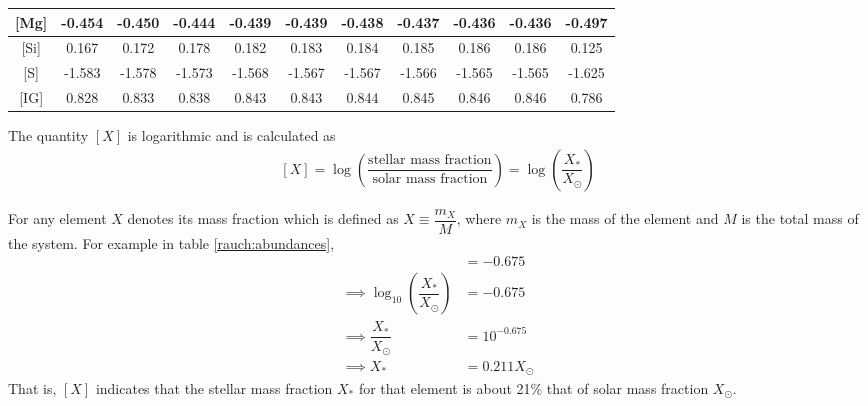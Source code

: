 \begin{table}[h!]
\begin{tabular}{|c|cccccccccc|}
						{[}Mg{]} & \multicolumn{1}{c|}{-0.454} & \multicolumn{1}{c|}{-0.450} & \multicolumn{1}{c|}{-0.444} & \multicolumn{1}{c|}{-0.439} & \multicolumn{1}{c|}{-0.439} & \multicolumn{1}{c|}{-0.438} & \multicolumn{1}{c|}{-0.437} & \multicolumn{1}{c|}{-0.436} & \multicolumn{1}{c|}{-0.436} & -0.497 \\ \hline
						{[}Si{]} & \multicolumn{1}{c|}{0.167} & \multicolumn{1}{c|}{0.172} & \multicolumn{1}{c|}{0.178} & \multicolumn{1}{c|}{0.182} & \multicolumn{1}{c|}{0.183} & \multicolumn{1}{c|}{0.184} & \multicolumn{1}{c|}{0.185} & \multicolumn{1}{c|}{0.186} & \multicolumn{1}{c|}{0.186} & 0.125 \\ \hline
						{[}S{]} & \multicolumn{1}{c|}{-1.583} & \multicolumn{1}{c|}{-1.578} & \multicolumn{1}{c|}{-1.573} & \multicolumn{1}{c|}{-1.568} & \multicolumn{1}{c|}{-1.567} & \multicolumn{1}{c|}{-1.567} & \multicolumn{1}{c|}{-1.566} & \multicolumn{1}{c|}{-1.565} & \multicolumn{1}{c|}{-1.565} & -1.625 \\ \hline
						{[}IG{]} & \multicolumn{1}{c|}{0.828} & \multicolumn{1}{c|}{0.833} & \multicolumn{1}{c|}{0.838} & \multicolumn{1}{c|}{0.843} & \multicolumn{1}{c|}{0.843} & \multicolumn{1}{c|}{0.844} & \multicolumn{1}{c|}{0.845} & \multicolumn{1}{c|}{0.846} & \multicolumn{1}{c|}{0.846} & 0.786 \\ \hline
					\end{tabular}
				\end{table}
				
				The quantity $[X]$ is logarithmic and is calculated as
				\begin{align}
					\label{rauch:[X]}
					[X]=\log{\left(\dfrac{\text{stellar mass fraction}}{\text{solar mass fraction}}\right)}=\log{\left(\dfrac{X_*}{X_\odot}\right)}
				\end{align}
				
				For any element $X$ denotes its mass fraction which is defined as $X\equiv\dfrac{m_X}{M}$, where $m_X$ is the mass of the element and $M$ is the total mass of the system. For example in table \ref{rauch:abundances},
				\begin{align*}
					[X]&=-0.675 \\
					\implies \log_{10}\left(\dfrac{X_*}{X_\odot}\right)&=-0.675 \\
					\implies \dfrac{X_*}{X_\odot}&=10^{-0.675} \\
					\implies X_*&=0.211X_\odot
				\end{align*}
				That is, $[X]$ indicates that the stellar mass fraction $X_*$ for that element is about 21\% that of solar mass fraction $X_\odot$.
				
